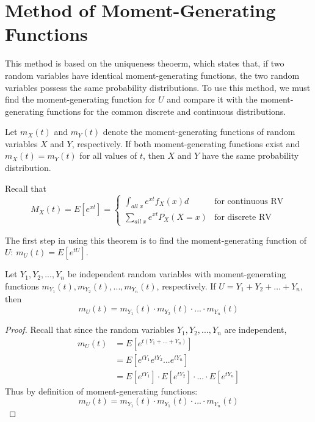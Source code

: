 \documentclass[12pt, a4paper, twoside, openright, titlepage]{book}
\begin{document}
\section{\textsection Method of Moment-Generating Functions}

\begin{rmk}{}{}
    This method is based on the uniqueness theoerm, which states that, if two random variables have identical moment-generating functions, the two random variables possess the same probability distributions. To use this method, we must find the moment-generating function for $U$ and compare it with the moment-generating functions for the common discrete and continuous distributions.
\end{rmk}

\begin{thm}{}{}
    Let $m_X(t)$ and $m_Y(t)$ denote the moment-generating functions of random variables $X$ and $Y$, respectively. If both moment-generating functions exist and $m_X(t) = m_Y(t)$ for all values of $t$, then $X$ and $Y$ have the same probability distribution.
\end{thm}

\begin{rec}{}{}
    Recall that \begin{equation*}
        M_X(t) = E[e^{xt}] = \left\{\begin{array}{lc} \int_{all\;x}e^{xt}f_X(x)d & \text{for continuous RV} \\ \sum_{all\;x}e^{xt}P_X(X=x) & \text{for discrete RV} \end{array}\right.
    \end{equation*}
\end{rec}




The first step in using this theorem is to find the moment-generating function of $U$: $m_U(t) = E[e^{tU}]$.

\begin{thm}{}{}
    Let $Y_1,Y_2,...,Y_n$ be independent random variables with moment-generating functions $m_{Y_1}(t),m_{Y_2}(t),...,m_{Y_n}(t)$, respectively. If $U = Y_1 + Y_2 + \hdots + Y_n$, then \begin{equation*}
        m_U(t) = m_{Y_1}(t)\cdot m_{Y_2}(t)\cdot ... \cdot m_{Y_n}(t)
    \end{equation*}
\end{thm}
\begin{proof}{}{}
    Recall that since the random variables $Y_1,Y_2,...,Y_n$ are independent, \begin{align*}
        m_U(t) &= E[e^{t(Y_1+...+Y_n)}] \\
        &= E[e^{tY_1}e^{tY_2}...e^{tY_n}] \\
        &= E[e^{tY_1}]\cdot E[e^{tY_2}] \cdot ... \cdot E[e^{tY_n}]
    \end{align*}
    Thus by definition of moment-generating functions:\begin{equation*}
        m_U(t) = m_{Y_1}(t)\cdot m_{Y_1}(t)\cdot ... \cdot m_{Y_n}(t)
    \end{equation*}
\end{proof}
\end{document}
